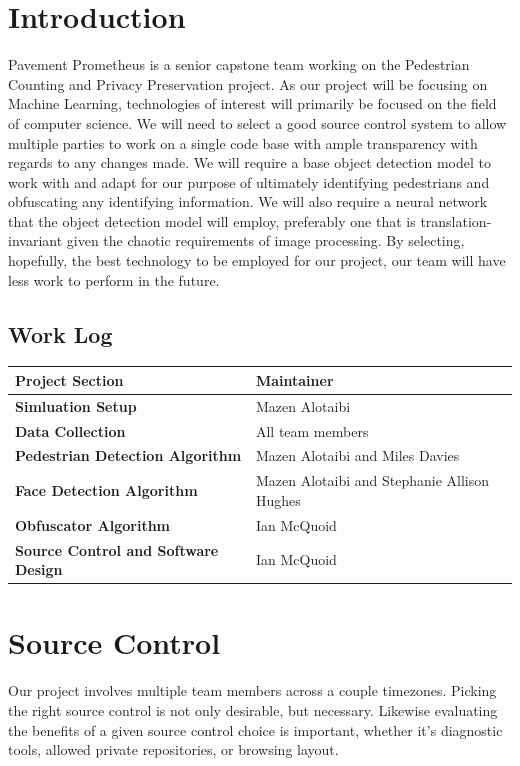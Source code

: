 \documentclass[onecolumn, draftclsnofoot,10pt, compsoc]{IEEEtran}
\def \callian{            Ian McQuoid  }
\def \callmazen{            Mazen Alotaibi }
\def \callmiles{            Miles Davies  }
\def \callsteph{            Stephanie Allison Hughes }
\begin{document}
\section{Introduction}
Pavement Prometheus is a senior capstone team working on the Pedestrian Counting and Privacy Preservation project. As our project will be focusing on Machine Learning, technologies of interest will primarily be focused on the field of computer science. We will need to select a good source control system to allow multiple parties to work on a single code base with ample transparency with regards to any changes made. We will require a base object detection model to work with and adapt for our purpose of ultimately identifying pedestrians and obfuscating any identifying information. We will also require a neural network that the object detection model will employ, preferably one that is translation-invariant given the chaotic requirements of image processing. By selecting, hopefully, the best technology to be employed for our project, our team will have less work to perform in the future.
\subsection{Work Log}
\begin{center}
  \begin{tabular}{ | l | p{10cm} | } 
    \hline \textbf{Project Section} & \textbf{Maintainer} \\ \hline
    \textbf{Simluation Setup} & \callmazen{} \\ \hline
    \textbf{Data Collection} & All team members \\ \hline
    \textbf{Pedestrian Detection Algorithm} & \callmazen{} and \callmiles{} \\ \hline
    \textbf{Face Detection Algorithm} & \callmazen{} and \callsteph{} \\ \hline
    \textbf{Obfuscator Algorithm} & \callian{}\\ \hline
    \textbf{Source Control and Software Design} & \callian{}\\ \hline
  \end{tabular}
\end{center}
\section{Source Control}
Our project involves multiple team members across a couple timezones. Picking the right source control is not only desirable, but necessary. Likewise evaluating the benefits of a given source control choice is important, whether it's diagnostic tools, allowed private repositories, or browsing layout.
\end{document}
